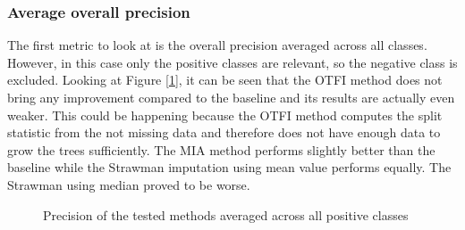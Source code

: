 \documentclass[11pt]{article}
\begin{document}
      \subsubsection{Average overall precision}
        The first metric to look at is the overall precision averaged across all classes. However, in this case only the positive classes are relevant, so the negative class is excluded. Looking at Figure [\ref{figure:overall_prec}], it can be seen that the OTFI method does not bring any improvement compared to the baseline and its results are actually even weaker. This could be happening because the OTFI method computes the split statistic from the not missing data and therefore does not have enough data to grow the trees sufficiently. The MIA method performs slightly better than the baseline while the Strawman imputation using mean value performs equally. The Strawman using median proved to be worse.
        \begin{figure}
          \centering
          \caption{Precision of the tested methods averaged across all positive classes}
          \label{figure:overall_prec}
        \end{figure}
      \newpage
\end{document}
